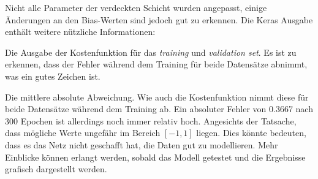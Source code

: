 Nicht alle Parameter der verdeckten Schicht wurden angepasst, einige
Änderungen an den Bias-Werten sind jedoch gut zu erkennen.
Die Keras Ausgabe enthält weitere nützliche Informationen:
\begin{description}[font=\normalfont, style=nextline]
\item[\pyconinline{loss} und \pyconinline{val_loss}]
Die Ausgabe der Kostenfunktion für das \textit{training} und \textit{validation set}.
Es ist zu erkennen, dass der Fehler während
dem Training für beide Datensätze abnimmt,
was ein gutes Zeichen ist.
\item[\pyconinline{mae} und \pyconinline{val_mae}]
Die mittlere absolute Abweichung. Wie auch die Kostenfunktion
nimmt diese für beide Datensätze während dem Training ab.
Ein absoluter Fehler von \num{0.3667}
nach 300 Epochen ist allerdings noch immer relativ hoch.
Angesichts der Tatsache, dass mögliche Werte ungefähr im
Bereich $[-1, 1]$ liegen.
Dies könnte bedeuten, dass es das Netz nicht geschafft hat, die Daten
gut zu modellieren. Mehr Einblicke können erlangt werden, sobald
das Modell getestet und die Ergebnisse grafisch dargestellt werden.
\end{description}


